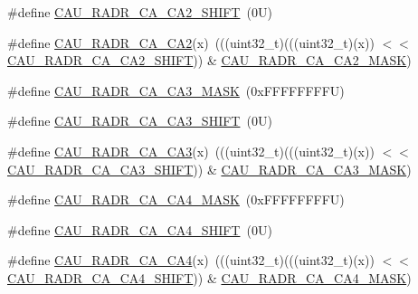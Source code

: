 \begin{DoxyCompactItemize}
\item 
\#define \mbox{\hyperlink{group___c_a_u___register___masks_gac9854347914cb338851c9a252aca148e}{C\+A\+U\+\_\+\+R\+A\+D\+R\+\_\+\+C\+A\+\_\+\+C\+A2\+\_\+\+S\+H\+I\+FT}}~(0\+U)
\item 
\#define \mbox{\hyperlink{group___c_a_u___register___masks_ga3d1fbf4e309510b81c96da1080f52d32}{C\+A\+U\+\_\+\+R\+A\+D\+R\+\_\+\+C\+A\+\_\+\+C\+A2}}(x)~(((uint32\+\_\+t)(((uint32\+\_\+t)(x)) $<$$<$ \mbox{\hyperlink{group___c_a_u___register___masks_gac9854347914cb338851c9a252aca148e}{C\+A\+U\+\_\+\+R\+A\+D\+R\+\_\+\+C\+A\+\_\+\+C\+A2\+\_\+\+S\+H\+I\+FT}})) \& \mbox{\hyperlink{group___c_a_u___register___masks_ga7fa186d5e73cc29fa76adb228433030e}{C\+A\+U\+\_\+\+R\+A\+D\+R\+\_\+\+C\+A\+\_\+\+C\+A2\+\_\+\+M\+A\+SK}})
\item 
\#define \mbox{\hyperlink{group___c_a_u___register___masks_ga954f8fa4bd147e796210d7d13b423765}{C\+A\+U\+\_\+\+R\+A\+D\+R\+\_\+\+C\+A\+\_\+\+C\+A3\+\_\+\+M\+A\+SK}}~(0x\+F\+F\+F\+F\+F\+F\+F\+F\+U)
\item 
\#define \mbox{\hyperlink{group___c_a_u___register___masks_ga63b462a741709ed694a6bb20912783e4}{C\+A\+U\+\_\+\+R\+A\+D\+R\+\_\+\+C\+A\+\_\+\+C\+A3\+\_\+\+S\+H\+I\+FT}}~(0\+U)
\item 
\#define \mbox{\hyperlink{group___c_a_u___register___masks_gaa8819ee05a7fdbb53bee279104bf7d33}{C\+A\+U\+\_\+\+R\+A\+D\+R\+\_\+\+C\+A\+\_\+\+C\+A3}}(x)~(((uint32\+\_\+t)(((uint32\+\_\+t)(x)) $<$$<$ \mbox{\hyperlink{group___c_a_u___register___masks_ga63b462a741709ed694a6bb20912783e4}{C\+A\+U\+\_\+\+R\+A\+D\+R\+\_\+\+C\+A\+\_\+\+C\+A3\+\_\+\+S\+H\+I\+FT}})) \& \mbox{\hyperlink{group___c_a_u___register___masks_ga954f8fa4bd147e796210d7d13b423765}{C\+A\+U\+\_\+\+R\+A\+D\+R\+\_\+\+C\+A\+\_\+\+C\+A3\+\_\+\+M\+A\+SK}})
\item 
\#define \mbox{\hyperlink{group___c_a_u___register___masks_ga9d0f7744ac9647b00fd84c95c76e763b}{C\+A\+U\+\_\+\+R\+A\+D\+R\+\_\+\+C\+A\+\_\+\+C\+A4\+\_\+\+M\+A\+SK}}~(0x\+F\+F\+F\+F\+F\+F\+F\+F\+U)
\item 
\#define \mbox{\hyperlink{group___c_a_u___register___masks_gaeb4fe1e9be3bcb2b1ac74660b92e9a4b}{C\+A\+U\+\_\+\+R\+A\+D\+R\+\_\+\+C\+A\+\_\+\+C\+A4\+\_\+\+S\+H\+I\+FT}}~(0\+U)
\item 
\#define \mbox{\hyperlink{group___c_a_u___register___masks_ga20080f8c8199450d8260df2db339e74c}{C\+A\+U\+\_\+\+R\+A\+D\+R\+\_\+\+C\+A\+\_\+\+C\+A4}}(x)~(((uint32\+\_\+t)(((uint32\+\_\+t)(x)) $<$$<$ \mbox{\hyperlink{group___c_a_u___register___masks_gaeb4fe1e9be3bcb2b1ac74660b92e9a4b}{C\+A\+U\+\_\+\+R\+A\+D\+R\+\_\+\+C\+A\+\_\+\+C\+A4\+\_\+\+S\+H\+I\+FT}})) \& \mbox{\hyperlink{group___c_a_u___register___masks_ga9d0f7744ac9647b00fd84c95c76e763b}{C\+A\+U\+\_\+\+R\+A\+D\+R\+\_\+\+C\+A\+\_\+\+C\+A4\+\_\+\+M\+A\+SK}})
$$
\end{DoxyCompactItemize}
